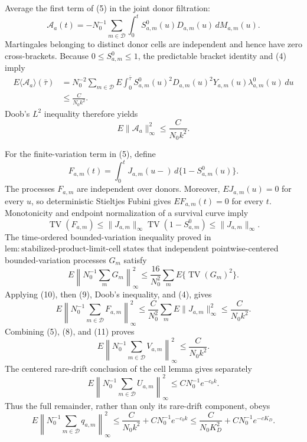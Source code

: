 Average the first term of (5) in the joint donor filtration:
\[
 \mathcal A_a(t)=-N_0^{-1}\sum_{m\in\mathcal D}
 \int_0^tS^0_{a,m}(u)D_{a,m}(u)\,dM_{a,m}(u).          \tag{6}
\]
Martingales belonging to distinct donor cells are independent and hence have
zero cross-brackets.  Because \(0\leq S^0_{a,m}\leq1\), the predictable
bracket identity and (4) imply
\[
 \begin{split}
 E\langle\mathcal A_a\rangle(\bar\tau)
 &=N_0^{-2}\sum_{m\in\mathcal D}E\int_0^{\bar\tau}
   S^0_{a,m}(u)^2D_{a,m}(u)^2Y_{a,m}(u)
   \lambda^0_{a,m}(u)\,du\\
 &\leq \frac{C}{N_0k^2}.
 \end{split}                                           \tag{7}
\]
Doob's \(L^2\) inequality therefore yields
\[
 E\|\mathcal A_a\|_\infty^2\leq\frac{C}{N_0k^2}.     \tag{8}
\]

For the finite-variation term in (5), define
\[
 F_{a,m}(t)=\int_0^tJ_{a,m}(u-)\,d\{1-S^0_{a,m}(u)\}.
\]
The processes \(F_{a,m}\) are independent over donors.  Moreover,
\(EJ_{a,m}(u)=0\) for every \(u\), so deterministic Stieltjes Fubini gives
\(EF_{a,m}(t)=0\) for every \(t\).  Monotonicity and endpoint normalization
of a survival curve imply
\[
 \operatorname{TV}(F_{a,m})
 \leq\|J_{a,m}\|_\infty
      \operatorname{TV}(1-S^0_{a,m})
 \leq\|J_{a,m}\|_\infty.                              \tag{9}
\]
The time-ordered bounded-variation inequality proved in
\(\mathrm{lem:stabilized\mbox{-}product\mbox{-}limit\mbox{-}cell}\)
states that independent pointwise-centered bounded-variation processes
\(G_m\) satisfy
\[
 E\left\|N_0^{-1}\sum_mG_m\right\|_\infty^2
 \leq\frac{16}{N_0^2}\sum_mE\{\operatorname{TV}(G_m)^2\}. \tag{10}
\]
Applying (10), then (9), Doob's inequality, and (4), gives
\[
 E\left\|N_0^{-1}\sum_{m\in\mathcal D}F_{a,m}\right\|_\infty^2
 \leq\frac{C}{N_0^2}\sum_mE\|J_{a,m}\|_\infty^2
 \leq\frac{C}{N_0k^2}.                                \tag{11}
\]
Combining (5), (8), and (11) proves
\[
 E\left\|N_0^{-1}\sum_{m\in\mathcal D}V_{a,m}\right\|_\infty^2
 \leq\frac{C}{N_0k^2}.                                \tag{12}
\]
The centered rare-drift conclusion of the cell lemma gives separately
\[
 E\left\|N_0^{-1}\sum_{m\in\mathcal D}U_{a,m}\right\|_\infty^2
 \leq C N_0^{-1}e^{-c_0k}.                             \tag{13}
\]
Thus the full remainder, rather than only its rare-drift component, obeys
\[
 E\left\|N_0^{-1}\sum_{m\in\mathcal D}q_{a,m}\right\|_\infty^2
 \leq\frac{C}{N_0k^2}+C N_0^{-1}e^{-c_0k}
 \leq\frac{C}{N_0K_D^2}+C N_0^{-1}e^{-cK_D}.           \tag{14}
\]

